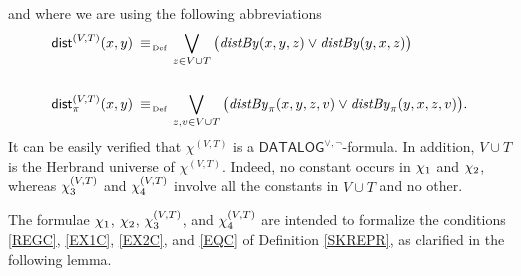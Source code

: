 \documentclass[manyauthors]{fundam}
\newcommand{\DisjDatalog}{\ensuremath{\mathsf{DATALOG}^{\vee,\neg}}\xspace}
\begin{document}
and where we are using the following abbreviations
\begin{align*}
%
\distS^{(V,T)}(x,y) \equivAs {} & \bigvee\limits_{z \in V \cup 
T}\big(\distby{x}{y}{z} \vee \distby{y}{x}{z}\big) \\ \\
%
\distPS^{(V,T)}(x,y) \equivAs {} & \bigvee\limits_{z,v \in V \cup 
T}\big(\distPby{x}{y}{z}{v} \vee \distPby{y}{x}{z}{v}\big) .
\end{align*}
%
It can be easily verified that $\chi^{(V,T)}$ is a
$\DisjDatalog$-formula. In addition, $V \cup T$ is the Herbrand
universe of $\chi^{(V,T)}$. Indeed, no constant occurs in
$\chi_1$ and $\chi_2$, whereas $\chi_3^{(V,T)}$ and $\chi_4^{(V,T)}$ involve
all the constants in $V \cup T$ and no other.

%
The formulae $\chi_1$, $\chi_2$, $\chi_3^{(V,T)}$, and $\chi_4^{(V,T)}$ are intended 
to formalize the conditions \ref{REGC}, \ref{EX1C}, \ref{EX2C}, and 
\ref{EQC} of
Definition \ref{SKREPR}, as clarified in the following lemma.
\end{document}
